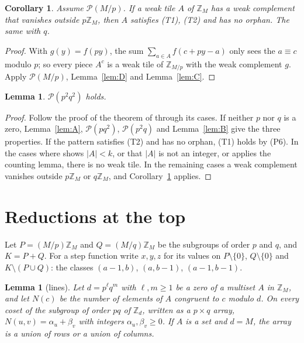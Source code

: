 \documentclass[11pt,a4paper]{amsart}
\newtheorem{lemma}[theorem]{Lemma}
\newtheorem{corollary}[theorem]{Corollary}
\theoremstyle{definition}
\theoremstyle{remark}
\newcommand{\Z}{\mathbb{Z}}
\newcommand{\PP}{\mathcal{P}}
\begin{document}
\begin{corollary}\label{cor:R}
Assume $\PP(M/p)$. If a weak tile $A$ of $\Z_M$ has a weak complement that vanishes outside $p\Z_M$, then $A$
satisfies \textup{(T1)}, \textup{(T2)} and has no orphan. The same with $q$.
\end{corollary}

\begin{proof}
With $g(y)=f(py)$, the sum $\sum_{a\in A}f(c+py-a)$ only sees the $a\equiv c$ modulo $p$; so every piece $A^c$
is a weak tile of $\Z_{M/p}$ with the weak complement $g$. Apply $\PP(M/p)$, Lemma~\ref{lem:D} and
Lemma~\ref{lem:C}.
\end{proof}

\begin{lemma}\label{lem:P}
$\PP(p^2q^2)$ holds.
\end{lemma}

\begin{proof}
Follow the proof of the theorem of \cite{N2} through its cases. If neither $p$ nor $q$ is a zero, Lemma~\ref{lem:A},
$\PP(pq^2)$, $\PP(p^2q)$ and Lemma~\ref{lem:B} give the three properties. If the pattern satisfies (T2) and has
no orphan, (T1) holds by (P6). In the cases where \cite{N2} shows $|A|<k$, or that $|A|$ is not an integer, or
applies the counting lemma, there is no weak tile. In the remaining cases a weak complement vanishes outside
$p\Z_M$ or $q\Z_M$, and Corollary~\ref{cor:R} applies.
\end{proof}

\section{Reductions at the top}\label{sec:top}

Let $P=(M/p)\Z_M$ and $Q=(M/q)\Z_M$ be the subgroups of order $p$ and $q$, and $K=P+Q$. For a step function
write $x,y,z$ for its values on $P\setminus\{0\}$, $Q\setminus\{0\}$ and $K\setminus(P\cup Q)$: the classes
$(a-1,b)$, $(a,b-1)$, $(a-1,b-1)$.

\begin{lemma}[lines]\label{lem:L}
Let $d=p^\ell q^m$ with $\ell,m\ge1$ be a zero of a multiset $A$ in $\Z_M$, and let $N(c)$ be the number of
elements of $A$ congruent to $c$ modulo $d$. On every coset of the subgroup of order $pq$ of $\Z_d$, written as
a $p\times q$ array, $N(u,v)=\alpha_u+\beta_v$ with integers $\alpha_u,\beta_v\ge0$. If $A$ is a set and $d=M$,
the array is a union of rows or a union of columns.
\end{lemma}
\end{document}
